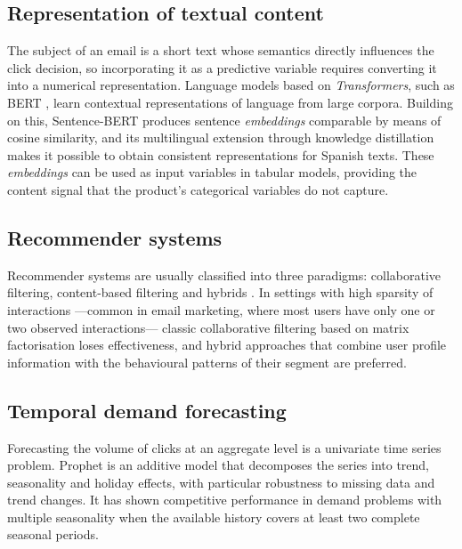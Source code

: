 \subsection{Representation of textual content}

The subject of an email is a short text whose semantics directly influences the click decision, so incorporating it as a predictive variable requires converting it into a numerical representation. Language models based on \textit{Transformers}, such as BERT \cite{devlin2019bert}, learn contextual representations of language from large corpora. Building on this, Sentence-BERT \cite{reimers2019sbert} produces sentence \textit{embeddings} comparable by means of cosine similarity, and its multilingual extension through knowledge distillation \cite{reimers2020multilingual} makes it possible to obtain consistent representations for Spanish texts. These \textit{embeddings} can be used as input variables in tabular models, providing the content signal that the product's categorical variables do not capture.

\subsection{Recommender systems}

Recommender systems are usually classified into three paradigms: collaborative filtering, content-based filtering and hybrids \cite{burke2002}. In settings with high sparsity of interactions ---common in email marketing, where most users have only one or two observed interactions--- classic collaborative filtering based on matrix factorisation \cite{koren2009} loses effectiveness, and hybrid approaches that combine user profile information with the behavioural patterns of their segment are preferred.

\subsection{Temporal demand forecasting}

Forecasting the volume of clicks at an aggregate level is a univariate time series problem. Prophet \cite{taylor2018forecasting} is an additive model that decomposes the series into trend, seasonality and holiday effects, with particular robustness to missing data and trend changes. It has shown competitive performance in demand problems with multiple seasonality when the available history covers at least two complete seasonal periods.

